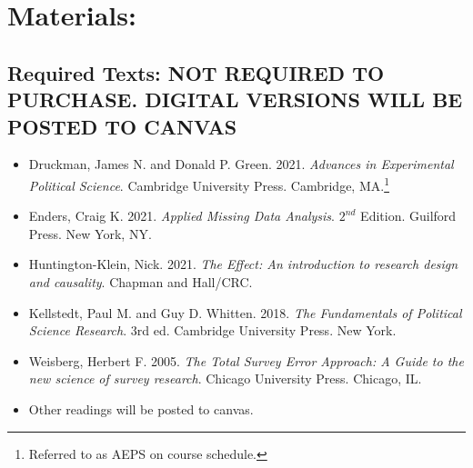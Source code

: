 \documentclass[11pt, a4paper]{article}
\begin{document}
\section*{Materials:}
    \subsection*{Required Texts: NOT REQUIRED TO PURCHASE. DIGITAL VERSIONS WILL BE POSTED TO CANVAS}
        \begin{itemize}
            \item Druckman, James N. and Donald P. Green. 2021. \textit{Advances in Experimental Political Science}. Cambridge University Press. Cambridge, MA.\footnote{Referred to as AEPS on course schedule.}
            \item Enders, Craig K. 2021. \textit{Applied Missing Data Analysis}. $2^{nd}$ Edition. Guilford Press. New York, NY.
            \item Huntington-Klein, Nick. 2021. \textit{The Effect: An introduction to research design and causality}. Chapman and Hall/CRC.
            \item Kellstedt, Paul M. and Guy D. Whitten. 2018. \textit{The Fundamentals of Political Science Research}. 3rd ed. Cambridge University Press. New York.
            \item Weisberg, Herbert F. 2005. \textit{The Total Survey Error Approach: A Guide to the new science of survey research}. Chicago University Press. Chicago, IL.
            \item Other readings will be posted to canvas.
        \end{itemize}
\end{document}
